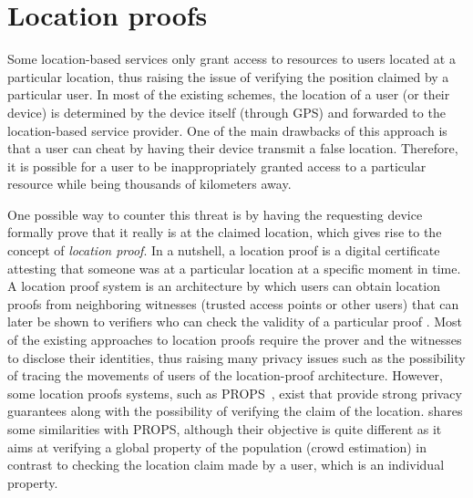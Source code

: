 \section{Location proofs}

Some location-based services only grant access to resources to users located at a particular location, thus raising the issue of verifying the position claimed by a particular user. 
In most of the existing schemes, the location of a user (or their device) is determined by the device itself (\eg through GPS) and forwarded to the location-based service provider. 
One of the main drawbacks of this approach is that a user can cheat by having their device transmit a false location. 
Therefore, it is possible for a user to be inappropriately granted access to a particular resource while being thousands of kilometers away.

One possible way to counter this threat is by having the requesting device formally prove that it really is at the claimed location, which gives rise to the concept of \emph{location proof}. 
In a nutshell, a location proof is a digital certificate attesting that someone was at a particular location at a specific moment in time. 
A location proof system is an architecture by which users can obtain location proofs from neighboring witnesses (\eg trusted access points or other users) that can later be shown to verifiers who can check the validity of a particular proof \cite{luo2010veriplace, zhu2011applaus}.
Most of the existing approaches to location proofs require the prover and the witnesses to disclose their identities, thus raising many privacy issues such as the possibility of tracing the movements of users of the location-proof architecture.
However, some location proofs systems, such as PROPS~\cite{PROPS}, exist that provide strong privacy guarantees along with the possibility of verifying the claim of the location.
\CROCUS shares some similarities with PROPS, although their objective is quite different as it aims at verifying a global property of the population (\ie crowd estimation) in contrast to checking the location claim made by a user, which is an individual property.

